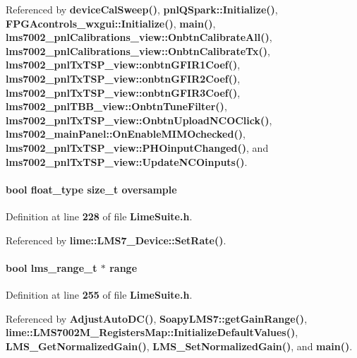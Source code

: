 Referenced by {\bf device\+Cal\+Sweep()}, {\bf pnl\+Q\+Spark\+::\+Initialize()}, {\bf F\+P\+G\+Acontrols\+\_\+wxgui\+::\+Initialize()}, {\bf main()}, {\bf lms7002\+\_\+pnl\+Calibrations\+\_\+view\+::\+Onbtn\+Calibrate\+All()}, {\bf lms7002\+\_\+pnl\+Calibrations\+\_\+view\+::\+Onbtn\+Calibrate\+Tx()}, {\bf lms7002\+\_\+pnl\+Tx\+T\+S\+P\+\_\+view\+::onbtn\+G\+F\+I\+R1\+Coef()}, {\bf lms7002\+\_\+pnl\+Tx\+T\+S\+P\+\_\+view\+::onbtn\+G\+F\+I\+R2\+Coef()}, {\bf lms7002\+\_\+pnl\+Tx\+T\+S\+P\+\_\+view\+::onbtn\+G\+F\+I\+R3\+Coef()}, {\bf lms7002\+\_\+pnl\+T\+B\+B\+\_\+view\+::\+Onbtn\+Tune\+Filter()}, {\bf lms7002\+\_\+pnl\+Tx\+T\+S\+P\+\_\+view\+::\+Onbtn\+Upload\+N\+C\+O\+Click()}, {\bf lms7002\+\_\+main\+Panel\+::\+On\+Enable\+M\+I\+M\+Ochecked()}, {\bf lms7002\+\_\+pnl\+Tx\+T\+S\+P\+\_\+view\+::\+P\+H\+Oinput\+Changed()}, and {\bf lms7002\+\_\+pnl\+Tx\+T\+S\+P\+\_\+view\+::\+Update\+N\+C\+Oinputs()}.

\paragraph[{oversample}]{\setlength{\rightskip}{0pt plus 5cm}bool {\bf float\+\_\+type} size\+\_\+t oversample}\label{group__FN__HIGH__LVL_ga374b0fae227f9f4e513a37dc8131c37c}


Definition at line {\bf 228} of file {\bf Lime\+Suite.\+h}.



Referenced by {\bf lime\+::\+L\+M\+S7\+\_\+\+Device\+::\+Set\+Rate()}.

\paragraph[{range}]{\setlength{\rightskip}{0pt plus 5cm}bool {\bf lms\+\_\+range\+\_\+t} $\ast$ range}\label{group__FN__HIGH__LVL_ga74d7bbee9e00069f4c5248ad2573d086}


Definition at line {\bf 255} of file {\bf Lime\+Suite.\+h}.



Referenced by {\bf Adjust\+Auto\+D\+C()}, {\bf Soapy\+L\+M\+S7\+::get\+Gain\+Range()}, {\bf lime\+::\+L\+M\+S7002\+M\+\_\+\+Registers\+Map\+::\+Initialize\+Default\+Values()}, {\bf L\+M\+S\+\_\+\+Get\+Normalized\+Gain()}, {\bf L\+M\+S\+\_\+\+Set\+Normalized\+Gain()}, and {\bf main()}.

